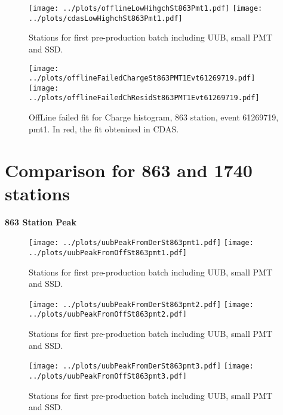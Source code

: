 \documentclass[twoside, final, 10pt]{articleMine}
\begin{document}
\begin{figure}[!tbh]
  \centering
  \subfigure
  {
    \texttt{[image: ../plots/offlineLowHihgchSt863Pmt1.pdf]}
    \texttt{[image: ../plots/cdasLowHighchSt863Pmt1.pdf]}
  }
  \caption{Stations for first pre-production batch including UUB, small PMT and SSD.}
  \label{figChLowHigh}
\end{figure}

\begin{figure}[!tbh]
  \centering
  \subfigure
  {
    \texttt{[image: ../plots/offlineFailedChargeSt863PMT1Evt61269719.pdf]}
    \texttt{[image: ../plots/offlineFailedChResidSt863PMT1Evt61269719.pdf]}
  }
  \caption{OffLine failed fit for Charge histogram, 863 station, event 61269719, pmt1.
  In red, the fit obtenined in CDAS.}
  \label{figChLowHigh}
\end{figure}
\clearpage

\section*{Comparison for 863 and 1740 stations}

{\bf 863 Station Peak}
\begin{figure}[!tbh]
  \centering
  \subfigure
  {
    \texttt{[image: ../plots/uubPeakFromDerSt863pmt1.pdf]}
    \texttt{[image: ../plots/uubPeakFromOffSt863pmt1.pdf]}
  }
  \caption{Stations for first pre-production batch including UUB, small PMT and SSD.}
  \label{figChLowHigh}
\end{figure}

\begin{figure}[!tbh]
  \centering
  \subfigure
  {
    \texttt{[image: ../plots/uubPeakFromDerSt863pmt2.pdf]}
    \texttt{[image: ../plots/uubPeakFromOffSt863pmt2.pdf]}
  }
  \caption{Stations for first pre-production batch including UUB, small PMT and SSD.}
  \label{figChLowHigh}
\end{figure}

\begin{figure}[!tbh]
  \centering
  \subfigure
  {
    \texttt{[image: ../plots/uubPeakFromDerSt863pmt3.pdf]}
    \texttt{[image: ../plots/uubPeakFromOffSt863pmt3.pdf]}
  }
  \caption{Stations for first pre-production batch including UUB, small PMT and SSD.}
  \label{figChLowHigh}
\end{figure}
\clearpage
\end{document}
